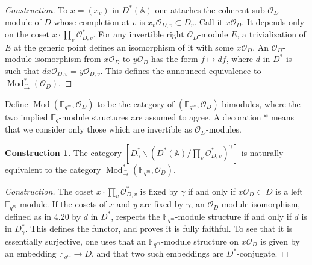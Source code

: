 \documentclass[11pt,a4paper]{article}
\theoremstyle{plain}
\theoremstyle{definition}
\newtheorem{construction}[theorem]{Construction}
\DeclareMathOperator{\Mod}{Mod}
\newcommand{\Fq}{\mathbb{F}_q}
\newcommand{\F}{\mathbb{F}}
\newcommand{\isom}{\xrightarrow{\sim}}
\begin{document}
\begin{proof}[Construction]
To $x = (x_v)$ in $D^*(\mathbb{A})$ one attaches the coherent sub-$\mathcal{O}_D$-module of $D$ whose completion at $v$ is $x_v \mathcal{O}_{D,v} \subset D_v$. Call it $x \mathcal{O}_D$. It depends only on the coset $x \cdot \prod_v \mathcal{O}_{D,v}^*$. For any invertible right $\mathcal{O}_D$-module $E$, a trivialization of $E$ at the generic point defines an isomorphism of it with some $x \mathcal{O}_D$. An $\mathcal{O}_D$-module isomorphism from $x \mathcal{O}_D$ to $y \mathcal{O}_D$ has the form $f \mapsto df$, where $d$ in $D^*$ is such that $dx \mathcal{O}_{D,v} = y \mathcal{O}_{D,v}$. This defines the announced equivalence to $\Mod^*_{\isom}(\mathcal{O}_D)$.
\end{proof}

Define $\Mod(\F_{q^m}, \mathcal{O}_D)$ to be the category of $(\F_{q^m}, \mathcal{O}_D)$-bimodules, where the two implied $\Fq$-module structures are assumed to agree. A decoration $*$ means that we consider only those which are invertible as $\mathcal{O}_D$-modules.

\begin{construction}
The category $[D_\gamma^* \backslash (D^*(\mathbb{A}) / \prod_v \mathcal{O}_{D,v}^*)^\gamma]$ is naturally equivalent to the category $\Mod^*_{\isom}(\F_{q^m}, \mathcal{O}_D)$.
\end{construction}

\begin{proof}[Construction]
The coset $x \cdot \prod_v \mathcal{O}_{D,v}^*$ is fixed by $\gamma$ if and only if $x \mathcal{O}_D \subset D$ is a left $\F_{q^m}$-module. If the cosets of $x$ and $y$ are fixed by $\gamma$, an $\mathcal{O}_D$-module isomorphism, defined as in 4.20 by $d$ in $D^*$, respects the $\F_{q^m}$-module structure if and only if $d$ is in $D_\gamma^*$. This defines the functor, and proves it is fully faithful. To see that it is essentially surjective, one uses that an $\F_{q^m}$-module structure on $x \mathcal{O}_D$ is given by an embedding $\F_{q^m} \to D$, and that two such embeddings are $D^*$-conjugate.
\end{proof}
\end{document}
